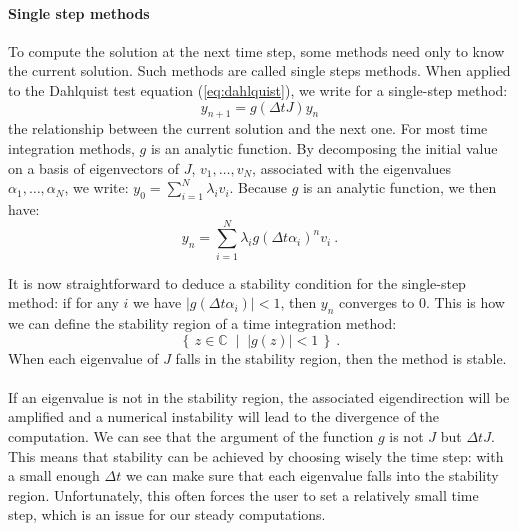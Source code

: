         \paragraph{Single step methods}
        To compute the solution at the next time step, some methods need only to know the current solution.
        Such methods are called single steps methods.
        When applied to the Dahlquist test equation (\ref{eq:dahlquist}), we write for a single-step method:
        \begin{equation}\label{eq:single_step}
          y_{n+1} = g\left(\Delta tJ\right)y_n
        \end{equation}
        the relationship between the current solution and the next one.
        For most time integration methods, $g$ is an analytic function.
        By decomposing the initial value on a basis of eigenvectors of $J$, $v_1, \dots, v_N$, associated with the eigenvalues $\alpha_1, \dots, \alpha_N$, we write: $y_0 = \sum_{i=1}^N \lambda_i v_i$.
        Because $g$ is an analytic function, we then have:
        \begin{equation}
          y_n = \sum_{i=1}^N \lambda_i g\left(\Delta t \alpha_i\right)^n v_i \ .
        \end{equation}

        It is now straightforward to deduce a stability condition for the single-step method: if for any $i$ we have $\left|g\left(\Delta t\alpha_i\right)\right| < 1$, then $y_n$ converges to 0.
        This is how we can define the stability region of a time integration method:
        \begin{equation}
          \left\{ \, z \in \mathbb{C} \; \mid \; \left| g\left(z\right) \right| < 1 \, \right\} \ .
        \end{equation}
        When each eigenvalue of $J$ falls in the stability region, then the method is stable.

        \paragraph{}
        If an eigenvalue is not in the stability region, the associated eigendirection will be amplified and a numerical instability will lead to the divergence of the computation.
        We can see that the argument of the function $g$ is not $J$ but $\Delta t J$.
        This means that stability can be achieved by choosing wisely the time step: with a small enough $\Delta t$ we can make sure that each eigenvalue falls into the stability region.
        Unfortunately, this often forces the user to set a relatively small time step, which is an issue for our steady computations.


